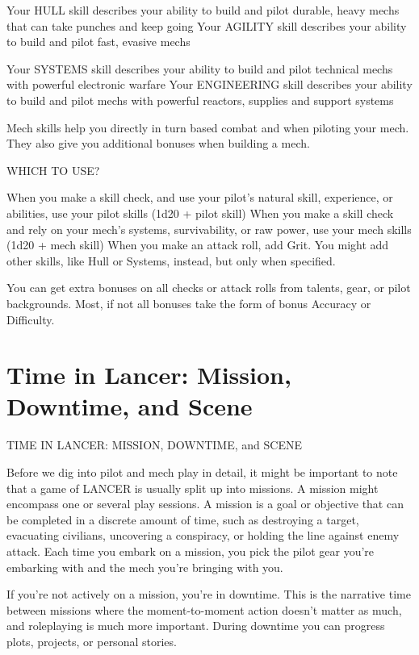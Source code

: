 Your HULL skill describes your ability to build and pilot durable, heavy mechs that can take
punches and keep going
Your AGILITY skill describes your ability to build and pilot fast, evasive mechs




Your SYSTEMS skill describes your ability to build and pilot technical mechs with powerful
electronic warfare
Your ENGINEERING skill describes your ability to build and pilot mechs with powerful reactors,
supplies and support systems

Mech skills help you directly in turn based combat and when piloting your mech. They also give
you additional bonuses when building a mech.

                                              WHICH TO USE?

When you make a skill check, and use your pilot’s natural skill, experience, or abilities, use your
pilot skills (1d20 + pilot skill)
When you make a skill check and rely on your mech’s systems, survivability, or raw power, use
your mech skills (1d20 + mech skill)
When you make an attack roll, add Grit. You might add other skills, like Hull or Systems, instead,
but only when specified.

You can get extra bonuses on all checks or attack rolls from talents, gear, or pilot backgrounds.
Most, if not all bonuses take the form of bonus Accuracy or Difficulty.

\chapter{Time in Lancer: Mission, Downtime, and Scene}
               TIME IN LANCER: MISSION, DOWNTIME, and SCENE

Before we dig into pilot and mech play in detail, it might be important to note that a game of
LANCER is usually split up into missions. A mission might encompass one or several play
sessions. A mission is a goal or objective that can be completed in a discrete amount of time,
such as destroying a target, evacuating civilians, uncovering a conspiracy, or holding the line
against enemy attack. Each time you embark on a mission, you pick the pilot gear you’re
embarking with and the mech you’re bringing with you.

If you’re not actively on a mission, you’re in downtime. This is the narrative time between
missions where the moment-to-moment action doesn’t matter as much, and roleplaying is much
more important. During downtime you can progress plots, projects, or personal stories.

